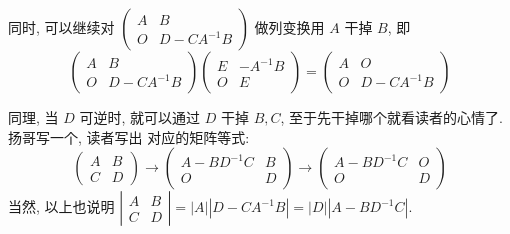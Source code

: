 \documentclass{article}
\begin{document}
同时, 可以继续对 $\left(\begin{array}{cc}A & B \\ O & D-C A^{-1} B\end{array}\right)$ 做列变换用 $A$ 干掉 $B$, 即
\begin{equation*}
    \left(\begin{array}{cc}
        A & B            \\
        O & D-C A^{-1} B
    \end{array}\right)\left(\begin{array}{cc}
        E & -A^{-1} B \\
        O & E
    \end{array}\right)=\left(\begin{array}{cc}
        A & O            \\
        O & D-C A^{-1} B
    \end{array}\right)
\end{equation*}

同理, 当 $D$ 可逆时, 就可以通过 $D$ 干掉 $B, C$, 至于先干掉哪个就看读者的心情了. 扬哥写一个, 读者写出
对应的矩阵等式:
\begin{equation*}
    \left(\begin{array}{cc}
        A & B \\
        C & D
    \end{array}\right) \longrightarrow\left(\begin{array}{cc}
        A-B D^{-1} C & B \\
        O            & D
    \end{array}\right) \longrightarrow\left(\begin{array}{cc}
        A-B D^{-1} C & O \\
        O            & D
    \end{array}\right)
\end{equation*}
当然, 以上也说明 $\left|\begin{array}{ll}A & B \\ C & D\end{array}\right|=|A|\left|D-C A^{-1} B\right|=|D|\left|A-B D^{-1} C\right| .$
\end{document}
